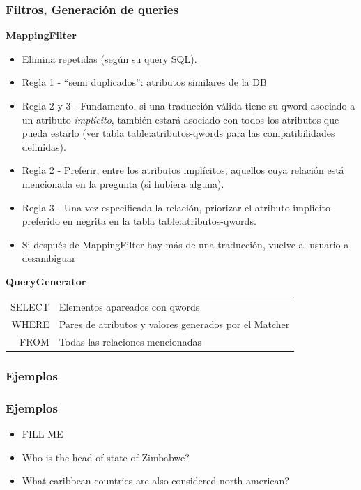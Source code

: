 \begin{frame}
\frametitle{Filtros, Generación de queries}

\textbf{MappingFilter}
\begin{itemize}
\item Elimina repetidas (según su query SQL).
\item Regla 1 - ``semi duplicados'': atributos similares de la DB\footnotemark 
\item Regla 2 y 3 - Fundamento. si una traducción válida tiene su qword asociado a un atributo \textit{implícito}, también estará asociado con todos los atributos que pueda estarlo (ver tabla table:atributos-qwords para las compatibilidades definidas).\footnotemark 
\item Regla 2 - Preferir, entre los atributos implícitos, aquellos cuya relación está mencionada en la pregunta (si hubiera alguna). 
\item Regla 3 - Una vez especificada la relación, priorizar el atributo implicito preferido en negrita en la tabla table:atributos-qwords. 
\item Si después de MappingFilter hay más de una traducción, vuelve al usuario a desambiguar
\end{itemize}
\textbf{QueryGenerator}

\centering
\begin{tabular}{ r | l }
SELECT &  Elementos apareados con qwords \\
WHERE & Pares de atributos y valores generados por el Matcher\\
FROM & Todas las relaciones mencionadas \\
\end{tabular}




\end{frame}

\subsubsection*{Ejemplos}
\begin{frame}
\frametitle{Ejemplos}
  \begin{itemize}
    \item {\color{red} FILL ME}
    \item Who is the head of state of Zimbabwe?
    \item What caribbean countries are also considered north american?
  \end{itemize}
\end{frame}
